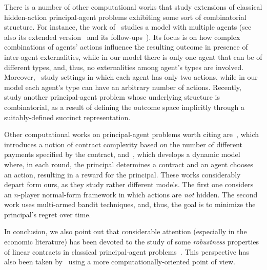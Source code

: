 There is a number of other computational works that study extensions of classical hidden-action principal-agent problems exhibiting some sort of combinatorial structure.
%
For instance, the work of~\citet{babaioff2006combinatorial} studies a model with multiple agents (see also its extended version~\citep{babaioff2012combinatorial} and its follow-ups~\citep{babaioff2009free,babaioff2010mixed}).
%
Its focus is on how complex combinations of agents' actions influence the resulting outcome in presence of inter-agent externalities, while in our model there is only one agent that can be of different types, and, thus, no externalities among agent's types are involved.
%
Moreover,~\citet{babaioff2006combinatorial} study settings in which each agent has only two actions, while in our model each agent's type can have an arbitrary number of actions.
%
Recently,~\citet{dutting2020complexity} study another principal-agent problem whose underlying structure is combinatorial, as a result of defining the outcome space implicitly through a suitably-defined succinct representation.

Other computational works on principal-agent problems worth citing are~\citep{babaioff2014contract}, which introduces a notion of contract complexity based on the number of different payments specified by the contract, and~\citep{ho2016adaptive}, which develops a dynamic model where, in each round, the principal determines a contract and an agent chooses an action, resulting in a reward for the principal.
%
These works considerably depart form ours, as they study rather different models.
%
The first one considers an $n$-player normal-form framework in which actions are \emph{not} hidden.
%
The second work uses multi-armed bandit techniques, and, thus, the goal is to minimize the principal’s regret over time.


In conclusion, we also point out that considerable attention (especially in the economic literature) has been devoted to the study of some \emph{robustness} properties of linear contracts in classical principal-agent problems~\citep{carroll2015robustness,carroll2019robustness}.
%
This perspective has also been taken by~\citet{dutting2019simple} using a more computationally-oriented point of view.
%

